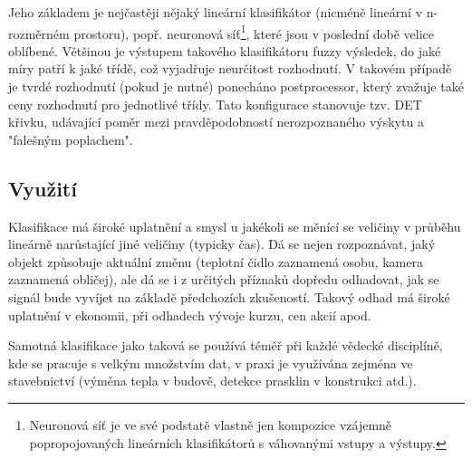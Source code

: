 \documentclass[10pt,a4paper]{article}
\begin{document}

  Jeho základem je nejčastěji nějaký lineární klasifikátor (nicméně lineární v n-rozměrném prostoru),
  popř. neuronová síť\footnote{Neuronová síť je ve své podstatě vlastně jen kompozice vzájemně
  popropojovaných lineárních klasifikátorů s váhovanými vstupy a výstupy.}, které jsou v poslední době
  velice oblíbené. Většinou je výstupem takového klasifikátoru fuzzy výsledek, do jaké míry patří k
  jaké třídě, což vyjadřuje neurčitost rozhodnutí. V takovém případě je tvrdé rozhodnutí (pokud je nutné)
  ponecháno postprocessor, který zvažuje také ceny rozhodnutí pro jednotlivé třídy. Tato konfigurace
  stanovuje tzv. DET křivku, udávající poměr mezi pravděpodobností nerozpoznaného výskytu a
  "falešným poplachem". \cite{IKRclassification}

  \subsection{Využití}
  Klasifikace má široké uplatnění a smysl u jakékoli se měnící se veličiny v průběhu lineárně narůstající
  jiné veličiny (typicky čas). Dá se nejen rozpoznávat, jaký objekt způsobuje aktuální změnu
  (teplotní čidlo zaznamená osobu, kamera zaznamená obličej), ale dá se i z určitých příznaků
  dopředu odhadovat, jak se signál bude vyvíjet na základě předchozích zkušeností. Takový odhad
  má široké uplatnění v ekonomii, při odhadech vývoje kurzu, cen akcií apod.

  Samotná klasifikace jako taková se používá téměř při každé vědecké disciplíně, kde se pracuje
  s velkým množstvím dat, v praxi je využívána zejména ve stavebnictví (výměna tepla v budově,
  detekce prasklin v konstrukci atd.).
\end{document}
